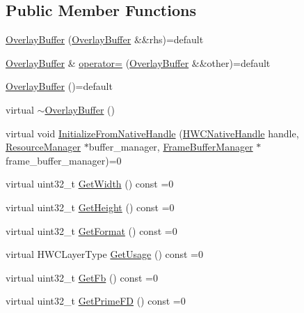\subsection*{Public Member Functions}
\begin{DoxyCompactItemize}
\item 
\mbox{\hyperlink{classhwcomposer_1_1OverlayBuffer_a374b13f717dd877d572abb153210bc1d}{Overlay\+Buffer}} (\mbox{\hyperlink{classhwcomposer_1_1OverlayBuffer}{Overlay\+Buffer}} \&\&rhs)=default
\item 
\mbox{\hyperlink{classhwcomposer_1_1OverlayBuffer}{Overlay\+Buffer}} \& \mbox{\hyperlink{classhwcomposer_1_1OverlayBuffer_a9c26bc9aa05fa166b672813b979efa79}{operator=}} (\mbox{\hyperlink{classhwcomposer_1_1OverlayBuffer}{Overlay\+Buffer}} \&\&other)=default
\item 
\mbox{\hyperlink{classhwcomposer_1_1OverlayBuffer_a8db3daed6fe18bf9ec7d707a7da8e741}{Overlay\+Buffer}} ()=default
\item 
virtual \mbox{\hyperlink{classhwcomposer_1_1OverlayBuffer_a4298ddf49e5125a23ec5add748dee148}{$\sim$\+Overlay\+Buffer}} ()
\item 
virtual void \mbox{\hyperlink{classhwcomposer_1_1OverlayBuffer_afcb712b3cc25aa9d5d4ee719ea660451}{Initialize\+From\+Native\+Handle}} (\mbox{\hyperlink{alios_2platformdefines_8h_ac0a2eaf260f556d17fe489911f017bdf}{H\+W\+C\+Native\+Handle}} handle, \mbox{\hyperlink{classhwcomposer_1_1ResourceManager}{Resource\+Manager}} $\ast$buffer\+\_\+manager, \mbox{\hyperlink{classhwcomposer_1_1FrameBufferManager}{Frame\+Buffer\+Manager}} $\ast$frame\+\_\+buffer\+\_\+manager)=0
\item 
virtual uint32\+\_\+t \mbox{\hyperlink{classhwcomposer_1_1OverlayBuffer_aa9d60e96c1b059944dfb952bbaf76f3b}{Get\+Width}} () const =0
\item 
virtual uint32\+\_\+t \mbox{\hyperlink{classhwcomposer_1_1OverlayBuffer_a30b6043a9da6a8116d0471d66f836878}{Get\+Height}} () const =0
\item 
virtual uint32\+\_\+t \mbox{\hyperlink{classhwcomposer_1_1OverlayBuffer_af12a31161149b0f89e92e5dfc18732c5}{Get\+Format}} () const =0
\item 
virtual H\+W\+C\+Layer\+Type \mbox{\hyperlink{classhwcomposer_1_1OverlayBuffer_ab504f33fc91e6e49b1168331ff71b622}{Get\+Usage}} () const =0
\item 
virtual uint32\+\_\+t \mbox{\hyperlink{classhwcomposer_1_1OverlayBuffer_a9860269bb8712eee5c7c4ca1c8846e9a}{Get\+Fb}} () const =0
\item 
virtual uint32\+\_\+t \mbox{\hyperlink{classhwcomposer_1_1OverlayBuffer_a32b5e1284161f9c129ad79ac11da760e}{Get\+Prime\+FD}} () const =0

\end{DoxyCompactItemize}
